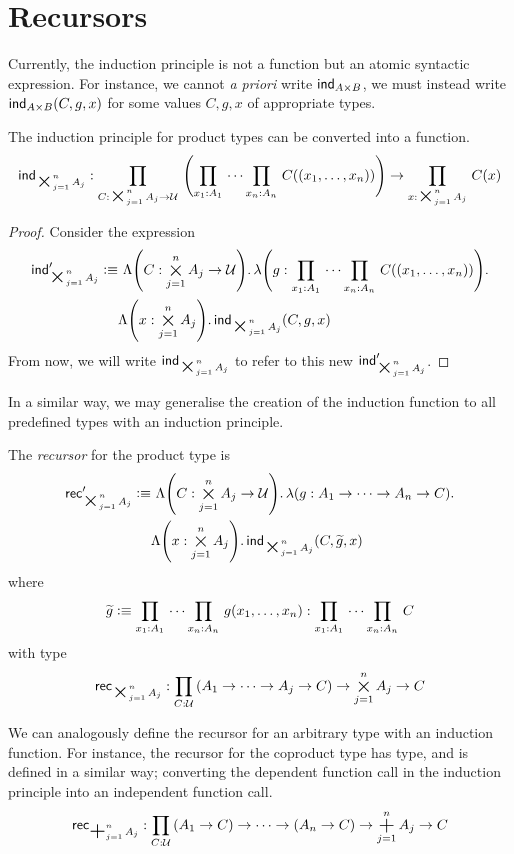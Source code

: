\documentclass[UKenglish, 11pt, a4paper, parskip=half]{scrbook}
\DeclareMathOperator*{\bigplus}{\scalerel*{+}{\textstyle\sum}}
\DeclareMathOperator*{\bigtimes}{\scalerel*{\times}{\textstyle\sum}}
\begin{document}

\section{Recursors}

Currently, the induction principle is not a function but an atomic syntactic expression.
For instance, we cannot \textit{a priori} write \( \mathsf{ind}_{A \times B} \), we must instead write \( \mathsf{ind}_{A \times B}(C,g,x) \) for some values \( C, g, x \) of appropriate types.
\begin{lem}
  The induction principle for product types can be converted into a function.
  \[
    \ind{\bigtimes_{j=1}^n A_j} : \prd{C:\bigtimes_{j=1}^n A_j \to \UU} \qty(\prd{x_1:A_1} \cdots \prd{x_n:A_n} C((x_1, \dots, x_n))) \to \prd{x:\bigtimes_{j=1}^n A_j} C(x)
  \]
\end{lem}
\begin{proof}
  Consider the expression
  \begin{align*}
    \ind{\bigtimes_{j=1}^n A_j}' \defeq &\ \Lambda\qty(C:\bigtimes_{j=1}^n A_j \to \UU).\,\lambda\qty(g:\prd{x_1:A_1} \cdots \prd{x_n:A_n} C((x_1, \dots, x_n))).\\
    &\Lambda\qty(x:\bigtimes_{j=1}^n A_j).\,\ind{\bigtimes_{j=1}^n A_j}(C,g,x)
  \end{align*}
  From now, we will write \( \ind{\bigtimes_{j=1}^n A_j} \) to refer to this new \( \ind{\bigtimes_{j=1}^n A_j}' \).
\end{proof}
In a similar way, we may generalise the creation of the induction function to all predefined types with an induction principle.
\begin{defn}
  The \textit{recursor} for the product type is
  \begin{align*}
    \rec{\bigtimes_{j=1}^n A_j}' \defeq &\ \Lambda\qty(C:\bigtimes_{j=1}^n A_j \to \UU).\,\lambda\qty(g:A_1 \to \dots \to A_n \to C).\\
    &\Lambda\qty(x:\bigtimes_{j=1}^n A_j).\,\ind{\bigtimes_{j=1}^n A_j}(C,\widetilde g,x)
  \end{align*}
  where
  \[
    \widetilde g \defeq \prd{x_1:A_1} \cdots \prd{x_n:A_n} g(x_1, \dots, x_n) : \prd{x_1:A_1} \cdots \prd{x_n:A_n} C
  \]
  with type
  \[
    \rec{\bigtimes_{j=1}^n A_j} : \prd{C:\UU} (A_1 \to \dots \to A_j \to C) \to \bigtimes_{j=1}^n A_j \to C
  \]
\end{defn}
We can analogously define the recursor for an arbitrary type with an induction function.
For instance, the recursor for the coproduct type has type, and is defined in a similar way; converting the dependent function call in the induction principle into an independent function call.
\[
  \rec{\bigplus_{j=1}^n A_j} : \prd{C:\UU} (A_1 \to C) \to \cdots \to (A_n \to C) \to \bigplus_{j=1}^n A_j \to C
\]
\end{document}
